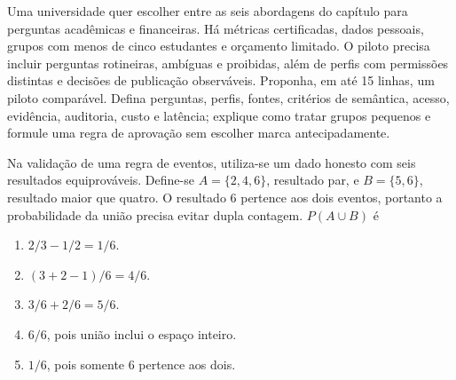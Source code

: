 \documentclass[12pt,a4paper]{article}
\begin{document}
\TextoBase
Uma universidade quer escolher entre as seis abordagens do capítulo para perguntas acadêmicas e financeiras. Há métricas certificadas, dados pessoais, grupos com menos de cinco estudantes e orçamento limitado.
O piloto precisa incluir perguntas rotineiras, ambíguas e proibidas, além de perfis com permissões distintas e decisões de publicação observáveis.
\FonteDidatica
\Comando Proponha, em até 15 linhas, um piloto comparável. Defina perguntas, perfis, fontes, critérios de semântica, acesso, evidência, auditoria, custo e latência; explique como tratar grupos pequenos e formule uma regra de aprovação sem escolher marca antecipadamente.
\EspacoDiscursiva

\TextoBase Na validação de uma regra de eventos, utiliza-se um dado honesto com seis resultados equiprováveis. Define-se $A=\{2,4,6\}$, resultado par, e $B=\{5,6\}$, resultado maior que quatro. O resultado 6 pertence aos dois eventos, portanto a probabilidade da união precisa evitar dupla contagem.
\FonteDidatica
\Comando $P(A\cup B)$ é
\begin{enumerate}[label=\Alph*)]
  \item $2/3-1/2=1/6$.
  \item $(3+2-1)/6=4/6$.
  \item $3/6+2/6=5/6$.
  \item $6/6$, pois união inclui o espaço inteiro.
  \item $1/6$, pois somente 6 pertence aos dois.
\end{enumerate}
\end{document}
